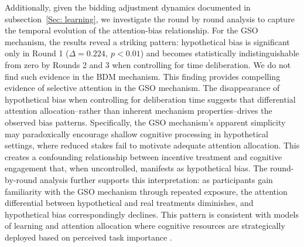 \documentclass[12pt]{article}
\begin{document}
Additionally, given the bidding adjustment dynamics documented in subsection~\ref{Sec: learning}, we investigate the round by round analysis to capture the temporal evolution of the attention-bias relationship. For the GSO mechanism, the results reveal a striking pattern: hypothetical bias is significant only in Round 1 (\(\Delta = 0.224, \ p < 0.01\)) and becomes statistically indistinguishable from zero by Rounds 2 and 3 when controlling for time deliberation. We do not find such evidence in the BDM mechanism.
This finding provides compelling evidence of  selective attention in the GSO mechanism. The disappearance of hypothetical bias when controlling for deliberation time suggests that differential attention allocation--rather than inherent mechanism properties--drives the observed bias patterns. Specifically, the GSO mechanism's apparent simplicity may paradoxically encourage shallow cognitive processing in hypothetical settings, where reduced stakes fail to motivate adequate attention allocation. This creates a confounding relationship between incentive treatment and cognitive engagement that, when uncontrolled, manifests as hypothetical bias.
The round-by-round analysis further supports this interpretation: as participants gain familiarity with the GSO mechanism through repeated exposure, the attention differential between hypothetical and real treatments diminishes, and hypothetical bias correspondingly declines. This pattern is consistent with models of learning and attention allocation where cognitive resources are strategically deployed based on perceived task importance \citep{gabaix2019behavioral}.
\end{document}
